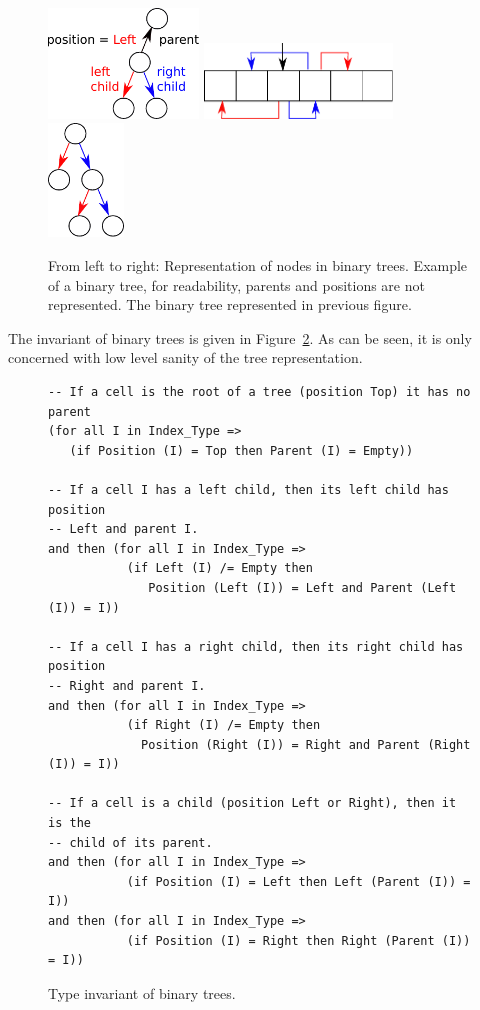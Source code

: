 \documentclass[11pt,a4paper]{article}
\begin{document}
\begin{figure}[ht]
\begin{center}
\includegraphics[width=4cm]{tree_structure.pdf}\hfill
\includegraphics[width=5cm]{binary_1.pdf}\hfill
\includegraphics[width=2cm]{binary_2.pdf}
\caption{\label{fig-binary} From left to right: Representation of nodes in binary trees.
Example of a binary tree, for readability, parents and positions are not represented.
The binary tree represented in previous figure.}
\end{center}
\end{figure}

The invariant of binary trees is given in Figure~\ref{fig-binary-inv}.
As can be seen, it is only concerned with low level sanity of the
tree representation.

\begin{figure}[ht]
\begin{small}
\begin{lstlisting}
-- If a cell is the root of a tree (position Top) it has no parent
(for all I in Index_Type =>
   (if Position (I) = Top then Parent (I) = Empty))

-- If a cell I has a left child, then its left child has position
-- Left and parent I.
and then (for all I in Index_Type =>
           (if Left (I) /= Empty then
              Position (Left (I)) = Left and Parent (Left (I)) = I))

-- If a cell I has a right child, then its right child has position
-- Right and parent I.
and then (for all I in Index_Type =>
           (if Right (I) /= Empty then
             Position (Right (I)) = Right and Parent (Right (I)) = I))

-- If a cell is a child (position Left or Right), then it is the
-- child of its parent.
and then (for all I in Index_Type =>
           (if Position (I) = Left then Left (Parent (I)) = I))
and then (for all I in Index_Type =>
           (if Position (I) = Right then Right (Parent (I)) = I))
\end{lstlisting}
\end{small}
\caption{\label{fig-binary-inv} Type invariant of binary trees.}
\end{figure}
\end{document}
